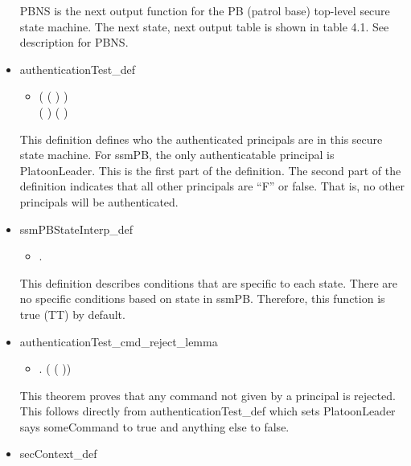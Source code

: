 \begin{itemize}
\begin{itemize}
 \end{itemize}
 PBNS is the next output function for the PB (patrol base) top-level secure state
 machine. The next state, next output table is shown in table 4.1. See description for PBNS.
\item authenticationTest_def
  \begin{itemize}
    \item[] \HOLTokenTurnstile{} ( (    ) \HOLSymConst{\HOLTokenEquiv{}} ) \HOLSymConst{\HOLTokenConj{}}\ \\
   (  \HOLSymConst{\HOLTokenEquiv{}} ) \HOLSymConst{\HOLTokenConj{}} (  \HOLSymConst{\HOLTokenEquiv{}} )
 \end{itemize}
 This definition defines who the authenticated principals are in this secure
 state machine. For ssmPB, the only authenticatable principal is PlatoonLeader.
 This is the first part of the definition. The second part of the definition indicates
 that all other principals are “F” or false. That is, no other principals will be authenticated.
\item ssmPBStateInterp_def
  \begin{itemize}
    \item[] \HOLTokenTurnstile{} \HOLSymConst{\HOLTokenForall{}}.   \HOLSymConst{=} 
    \end{itemize}
    This definition describes conditions that are specific to each state. There are
    no specific conditions based on state in ssmPB. Therefore, this function is true (TT) by default.
  \item authenticationTest_cmd_reject_lemma
    \begin{itemize}
    \item[] \HOLTokenTurnstile{} \HOLSymConst{\HOLTokenForall{}}. \HOLSymConst{\HOLTokenNeg{}} ( ( ))
    \end{itemize}
    This theorem proves that any command not given by a principal is rejected. This
    follows directly from authenticationTest_def which sets PlatoonLeader says someCommand to
    true and anything else to false.
  \item secContext_def
    \begin{itemize}

\end{itemize}
\end{itemize}
